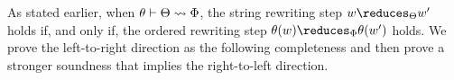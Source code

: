 As stated earlier, when $\theta \vdash \Theta \rightsquigarrow \Phi$, the string rewriting step $w \reduces_{\srsig} w'$ holds if, and only if, the ordered rewriting step $\theta(w) \reduces_{\orsig} \theta(w')$ holds.
We prove the left-to-right direction as the following completeness  and then prove a stronger soundness  that implies the right-to-left direction.





